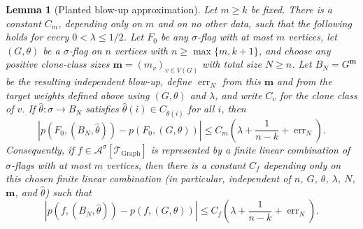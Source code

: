 \documentclass[11pt]{article}
\newtheorem{lemma}[lemma]{Lemma}
\theoremstyle{definition}
\newcommand{\A}{\mathcal{A}}
\newcommand{\T}{\mathcal{T}}
\begin{document}
\begin{lemma}[Planted blow-up approximation]\label{lem:planted-estimate}
Let $m\ge k$ be fixed.  There is a constant $C_m$, depending only on $m$ and
on no other data, such that the following holds for every
$0<\lambda\le 1/2$.  Let $F_0$ be any $\sigma$-flag with at most $m$ vertices,
let $(G,\theta)$ be a $\sigma$-flag on $n$ vertices with
$n\ge\max\{m,k+1\}$, and choose any positive clone-class sizes
$\mathbf m=(m_v)_{v\in V(G)}$ with total size $N\ge n$.  Let
$B_N=G^{\mathbf m}$ be the resulting independent blow-up, define
$\operatorname{err}_N$ from this $\mathbf m$ and from the target weights
defined above using $(G,\theta)$ and $\lambda$, and write $C_v$ for the clone
class of $v$.
If
$\widehat\theta:\sigma\to B_N$ satisfies
$\widehat\theta(i)\in C_{\theta(i)}$ for all $i$, then
\begin{equation}\label{eq:planted-estimate}
  \left|p(F_0,(B_N,\widehat\theta))-p(F_0,(G,\theta))\right|
  \le
  C_m\left(\lambda+\frac1{n-k}+\operatorname{err}_N\right).
\end{equation}
Consequently, if $f\in\A^\sigma[\T_{\mathrm{Graph}}]$ is represented by a finite
linear combination of $\sigma$-flags with at most $m$ vertices, then there is a
constant $C_f$ depending only on this chosen finite linear combination
(in particular, independent of $n$, $G$, $\theta$, $\lambda$, $N$,
$\mathbf m$, and $\widehat\theta$) such that
\begin{equation}\label{eq:planted-linear-estimate}
  \left|p(f,(B_N,\widehat\theta))-p(f,(G,\theta))\right|
  \le
  C_f\left(\lambda+\frac1{n-k}+\operatorname{err}_N\right).
\end{equation}
\end{lemma}
\end{document}
